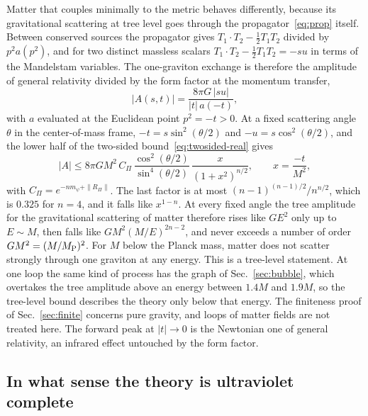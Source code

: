 \documentclass[a4paper,11pt]{article}
\begin{document}
Matter that couples minimally to the metric behaves differently, because its gravitational scattering at tree level goes through the propagator~\eqref{eq:prop} itself. Between conserved sources the propagator gives $T_1\!\cdot T_2-\frac12T_1T_2$ divided by $p^2a(p^2)$, and for two distinct massless scalars $T_1\!\cdot T_2-\frac12T_1T_2=-su$ in terms of the Mandelstam variables. The one-graviton exchange is therefore the amplitude of general relativity divided by the form factor at the momentum transfer,
\begin{equation}
\label{eq:matter}
|A(s,t)|=\frac{8\pi G\,|su|}{|t|\,a(-t)} ,
\end{equation}
with $a$ evaluated at the Euclidean point $p^2=-t>0$. At a fixed scattering angle $\theta$ in the center-of-mass frame, $-t=s\sin^2(\theta/2)$ and $-u=s\cos^2(\theta/2)$, and the lower half of the two-sided bound~\eqref{eq:twosided-real} gives
\[
|A|\le8\pi GM^2\,C_\Pi\,\frac{\cos^2(\theta/2)}{\sin^4(\theta/2)}\,\frac{x}{(1+x^2)^{n/2}},\qquad x=\frac{-t}{M^2},
\]
with $C_\Pi=e^{-nm_\psi+\|R_\Pi\|}$. The last factor is at most $(n-1)^{(n-1)/2}/n^{n/2}$, which is $0.325$ for $n=4$, and it falls like $x^{1-n}$. At every fixed angle the tree amplitude for the gravitational scattering of matter therefore rises like $GE^2$ only up to $E\sim M$, then falls like $GM^2(M/E)^{2n-2}$, and never exceeds a number of order $GM^2=(M/M_{\rm P})^2$. For $M$ below the Planck mass, matter does not scatter strongly through one graviton at any energy. This is a tree-level statement. At one loop the same kind of process has the graph of Sec.~\ref{sec:bubble}, which overtakes the tree amplitude above an energy between $1.4M$ and $1.9M$, so the tree-level bound describes the theory only below that energy. The finiteness proof of Sec.~\ref{sec:finite} concerns pure gravity, and loops of matter fields are not treated here. The forward peak at $|t|\to0$ is the Newtonian one of general relativity, an infrared effect untouched by the form factor.

\subsection{In what sense the theory is ultraviolet complete}
\label{sec:complete}
\end{document}
